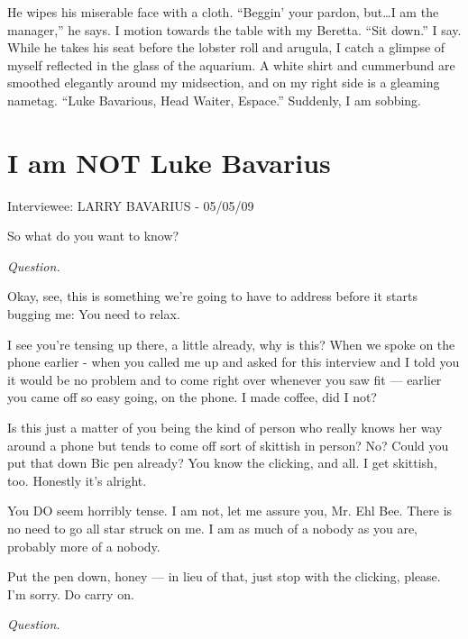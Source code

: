 He wipes his miserable face with a cloth. ``Beggin' your
pardon, but{\ldots}I am the manager,'' he says. I motion
towards the table with my Beretta. ``Sit down.'' I say.
While he takes his seat before the lobster roll and arugula, I
catch a glimpse of myself reflected in the glass of the aquarium. A
white shirt and cummerbund are smoothed elegantly around my
midsection, and on my right side is a gleaming nametag. ``Luke
Bavarious, Head Waiter, Espace.'' Suddenly, I am sobbing. 

 



\chapter{I am NOT Luke Bavarius}


Interviewee: LARRY BAVARIUS - 05/05/09









So what do you want to know?



{\em Question.}



Okay, see, this is something we're going to have to address
before it starts bugging me: You need to relax.

I see you're tensing up there, a little already, why is this?
When we spoke on the phone earlier - when you called me up and
asked for this interview and I told you it would be no problem and
to come right over whenever you saw fit --- earlier you came
off so easy going, on the phone. I made coffee, did I not?

Is this just a matter of you being the kind of person who really
knows her way around a phone but tends to come off sort of skittish
in person? No? Could you put that down Bic pen already? You know
the clicking, and all. I get skittish, too. Honestly it's
alright.

You DO seem horribly tense. I am not, let me assure you, Mr. Ehl
Bee. There is no need to go all star struck on me. I am as much of
a nobody as you are, probably more of a nobody.

Put the pen down, honey --- in lieu of that, just stop with the
clicking, please. I'm sorry. Do carry on.



{\em Question}.



